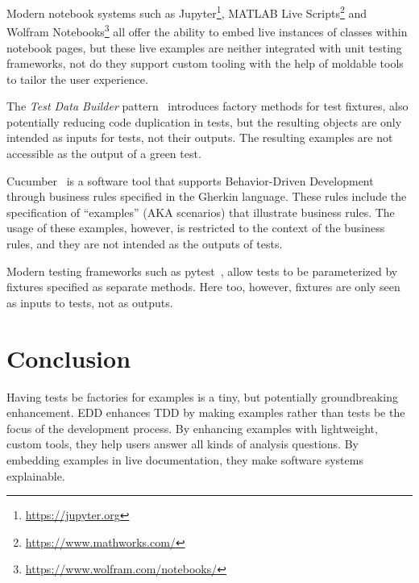\documentclass[sigplan,anonymous,review,10pt]{acmart}
\begin{document}
Modern notebook systems such as Jupyter\footnote{\url{https://jupyter.org}}, MATLAB Live Scripts\footnote{\url{https://www.mathworks.com/}} and Wolfram Notebooks\footnote{\url{https://www.wolfram.com/notebooks/}} all offer the ability to embed live instances of classes within notebook pages, but these live examples are neither integrated with unit testing frameworks, not do they support custom tooling with the help of moldable tools to tailor the user experience.


The \emph{Test Data Builder} pattern~\cite{Free09a} introduces factory methods for test fixtures, also potentially reducing code duplication in tests, but the resulting objects are only intended as inputs for tests, not their outputs.
The resulting examples are not accessible as the output of a green test.

Cucumber~\cite{Hell17a} is a software tool that supports Behavior-Driven Development through business rules specified in the Gherkin language.
These rules include the specification of ``examples'' (AKA scenarios) that illustrate business rules.
The usage of these examples, however, is restricted to the context of the business rules, and they are not intended as the outputs of tests.

Modern testing frameworks such as pytest~\cite{Okke22a}, allow tests to be parameterized by fixtures specified as separate methods.
Here too, however, fixtures are only seen as inputs to tests, not as outputs.

\section{Conclusion}\label{sec:conclusion}

Having tests be factories for examples is a tiny, but potentially groundbreaking enhancement.
EDD enhances TDD by making examples rather than tests be the focus of the development process.
By enhancing examples with lightweight, custom tools, they help users answer all kinds of analysis questions.
By embedding examples in live documentation, they make software systems explainable.





\end{document}
